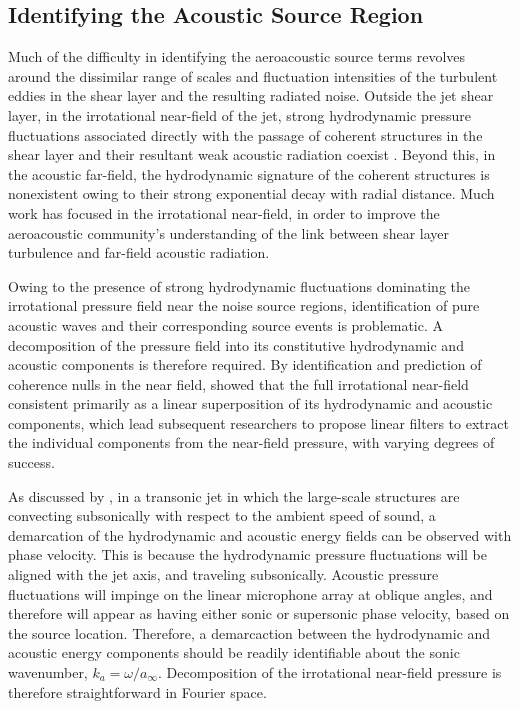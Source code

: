 \subsection{Identifying the Acoustic Source Region}
\label{sect:near_field_source_region}
Much of the difficulty in identifying the aeroacoustic source terms revolves around the dissimilar range of scales and fluctuation intensities of the turbulent eddies in the shear layer and the resulting radiated noise. 
Outside the jet shear layer, in the irrotational near-field of the jet, strong hydrodynamic pressure fluctuations associated directly with the passage of coherent structures in the shear layer and their resultant weak acoustic radiation coexist \citep{Arndt1997}. 
Beyond this, in the acoustic far-field, the hydrodynamic signature of the coherent structures is nonexistent owing to their strong exponential decay with radial distance.
Much work has focused in the irrotational near-field, in order to improve the aeroacoustic community's understanding of the link between shear layer turbulence and far-field acoustic radiation. 

Owing to the presence of strong hydrodynamic fluctuations dominating the irrotational pressure field near the noise source regions, identification of pure acoustic waves and their corresponding source events is problematic.
A decomposition of the pressure field into its constitutive hydrodynamic and acoustic components is therefore required. 
By identification and prediction of coherence nulls in the near field, \citet{Coiffet2006} showed that the full irrotational near-field consistent primarily as a linear superposition of its hydrodynamic and acoustic components, which lead subsequent researchers to propose linear filters to extract the individual components from the near-field pressure, with varying degrees of success. 

As discussed by \citet{Tinney2008}, in a transonic jet in which the large-scale structures are convecting subsonically with respect to the ambient speed of sound, a demarcation of the hydrodynamic and acoustic energy fields can be observed with phase velocity.
This is because the hydrodynamic pressure fluctuations will be aligned with the jet axis, and traveling subsonically. 
Acoustic pressure fluctuations will impinge on the linear microphone array at oblique angles, and therefore will appear as having either sonic or supersonic phase velocity, based on the source location. 
Therefore, a demarcaction between the hydrodynamic and acoustic energy components should be readily identifiable about the sonic wavenumber, $k_a = \omega / a_\infty$.
Decomposition of the irrotational near-field pressure is therefore straightforward in Fourier space.

